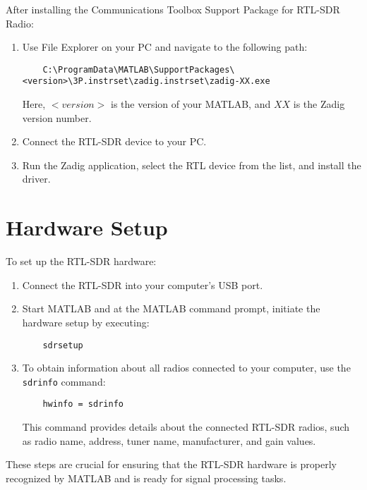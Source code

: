 After installing the Communications Toolbox Support Package for RTL-SDR Radio:

\begin{enumerate}
    \item Use File Explorer on your PC and navigate to the following path:
    \begin{verbatim}
    C:\ProgramData\MATLAB\SupportPackages\<version>\3P.instrset\zadig.instrset\zadig-XX.exe
    \end{verbatim}
    Here, \( <version> \) is the version of your MATLAB, and \( XX \) is the Zadig version number.
    
    \item Connect the RTL-SDR device to your PC.
    
    \item Run the Zadig application, select the RTL device from the list, and install the driver.
\end{enumerate}

\section*{Hardware Setup}

To set up the RTL-SDR hardware:

\begin{enumerate}
    \item Connect the RTL-SDR into your computer's USB port.
    
    \item Start MATLAB and at the MATLAB command prompt, initiate the hardware setup by executing:
    \begin{verbatim}
    sdrsetup
    \end{verbatim}
    
    \item To obtain information about all radios connected to your computer, use the \texttt{sdrinfo} command:
    \begin{verbatim}
    hwinfo = sdrinfo
    \end{verbatim}
    This command provides details about the connected RTL-SDR radios, such as radio name, address, tuner name, manufacturer, and gain values.
\end{enumerate}

These steps are crucial for ensuring that the RTL-SDR hardware is properly recognized by MATLAB and is ready for signal processing tasks.

